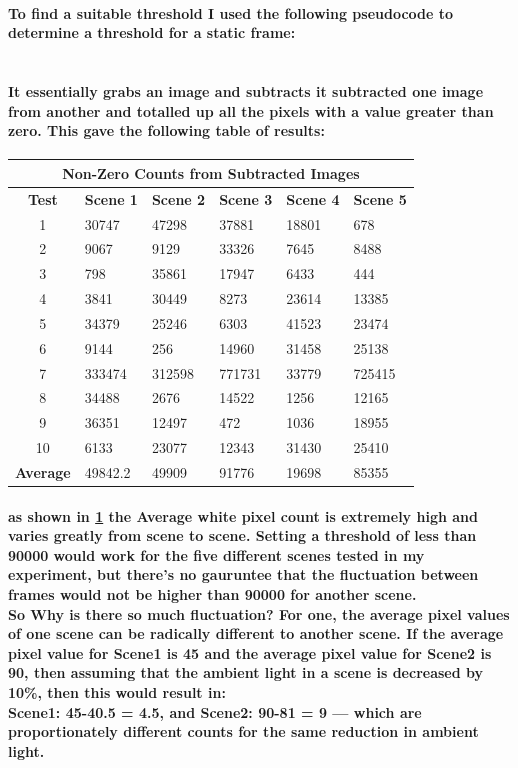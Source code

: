 \documentclass[11pt]{article} %
\begin{document}
\paragraph{To find a suitable threshold I used the following pseudocode to determine a threshold for a static frame:\\\\}

\paragraph{It essentially grabs an image and subtracts it subtracted one image from another and totalled up all the pixels with a value greater than zero. This gave the following table of results:}
\begin{center}
\begin{table}
	\begin{tabular}{| c | l | l | l | l | l | }
\hline
\multicolumn{6}{|c|}{\bf Non-Zero Counts from Subtracted Images} \\
\hline
\bf Test	&\bf Scene 1	&\bf Scene 2	&\bf Scene 3	&\bf Scene 4	&\bf Scene 5	\\ \hline
1	&30747	&47298	&37881	&18801	&678\\
2	&9067	&9129	&33326	&7645	&8488\\
3	&798	&35861	&17947	&6433	&444\\
4	&3841	&30449	&8273	&23614	&13385\\
5	&34379	&25246	&6303	&41523	&23474\\
6	&9144	&256	&14960	&31458	&25138\\
7	&333474	&312598	&771731	&33779	&725415\\
8	&34488	&2676	&14522	&1256	&12165\\
9	&36351	&12497	&472	&1036	&18955\\
10	&6133	&23077	&12343	&31430	&25410\\ \hline
\bf Average	&49842.2	&49909	&91776	&19698	&85355\\ \hline
	\end{tabular}
	\label{tab:sub1}
\end{table}
\end{center}
\paragraph{as shown in \cref{tab:sub1} the Average white pixel count is extremely high and varies greatly from scene to scene. Setting a threshold of less than 90000 would work for the five different scenes tested in my experiment, but there’s no gauruntee that the fluctuation between frames would not be higher than 90000 for another scene. \\
So Why is there so much fluctuation? For one, the average pixel values of one scene can be radically different to another scene. If the average pixel value for Scene1 is 45 and the average pixel value for Scene2 is 90, then assuming that the ambient light in a scene is decreased by 10\%, then this would result in:\\
Scene1:  45-40.5 = 4.5, and Scene2: 90-81 = 9 --- which are proportionately different counts for the same reduction in ambient light.\\
 }
\end{document}
